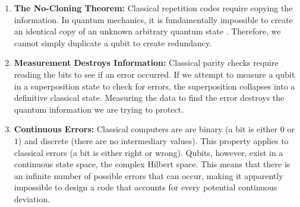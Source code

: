 \begin{enumerate}
    \item \textbf{The No-Cloning Theorem:} Classical repetition codes require copying the information. In quantum mechanics, it is fundamentally impossible to create an identical copy of an unknown arbitrary quantum state \cite{wootters1982single}. Therefore, we cannot simply duplicate a qubit to create redundancy.
    \item \textbf{Measurement Destroys Information:} Classical parity checks require reading the bits to see if an error occurred. If we attempt to measure a qubit in a superposition state to check for errors, the superposition collapses into a definitive classical state. Measuring the data to find the error destroys the quantum information we are trying to protect.
    \item \textbf{Continuous Errors:} Classical computers are are binary (a bit is either $0$ or $1$) and discrete (there are no intermediary values). This property applies to classical errors (a bit is either right or wrong). Qubits, however, exist in a continuous state space, the complex Hilbert space. This means that there is an infinite number of possible errors that can occur, making it apparently impossible to design a code that accounts for every potential continuous deviation.

\begin{figure}[hbt!]
\centering
{}
\end{figure}
\end{enumerate}
